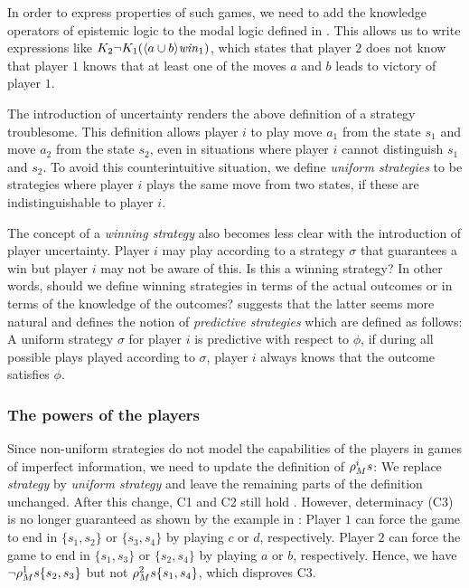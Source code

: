 In order to express properties of such games, we need to add the knowledge operators of epistemic logic to the modal logic defined in . This allows us to write expressions like $ K_{2} \neg K_{1} (\langle a \cup b \rangle \mathit{win}_{1}) $, which states that player $ 2 $ does not know that player $ 1 $ knows that at least one of the moves $ a $ and $ b $ leads to victory of player $ 1 $.

The introduction of uncertainty renders the above definition of a strategy troublesome. This definition allows player $ i $ to play move $ a_{1} $ from the state $ s_{1} $ and move $ a_{2} $ from the state $ s_{2} $, even in situations where player $ i $ cannot distinguish $ s_{1} $ and $ s_{2} $. To avoid this counterintuitive situation, we define \emph{uniform strategies} to be strategies where player $ i $ plays the same move from two states, if these are indistinguishable to player $ i $.

The concept of a \emph{winning strategy} also becomes less clear with the introduction of player uncertainty. Player $ i $ may play according to a strategy $ \sigma $ that guarantees a win but player $ i $ may not be aware of this. Is this a winning strategy? In other words, should we define winning strategies in terms of the actual outcomes or in terms of the knowledge of the outcomes? \cite{benthem2001a} suggests that the latter seems more natural and defines the notion of \emph{predictive strategies} which are defined as follows: A uniform strategy $ \sigma $ for player $ i $ is predictive with respect to $ \phi $, if during all possible plays played according to $ \sigma $, player $ i $ always knows that the outcome satisfies $ \phi $.

\subsubsection*{The powers of the players}

Since non-uniform strategies do not model the capabilities of the players in games of imperfect information, we need to update the definition of $ \rho_{M}^{ i } s $: We replace \emph{strategy} by \emph{uniform strategy} and leave the remaining parts of the definition unchanged. After this change, C1 and C2 still hold \cite{benthem2001a}. However, determinacy (C3) is no longer guaranteed as shown by the example in : Player $ 1 $ can force the game to end in $ \{ s_{1}, s_{2} \} $ or $ \{ s_{3}, s_{4} \} $ by playing $ c $ or $ d $, respectively. Player $ 2 $ can force the game to end in $ \{ s_{1}, s_{3} \} $ or $ \{ s_{2}, s_{4} \} $ by playing $ a $ or $ b $, respectively. Hence, we have $ \neg \rho_{M}^{ 1 } s\{ s_{2}, s_{3} \} $ but not $ \rho_{M}^{ 2 } s\{ s_{1}, s_{4} \} $, which disproves C3.

